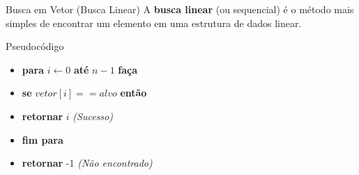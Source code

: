 \documentclass[9pt]{beamer}
\begin{document}
\begin{frame}{Busca em Vetor (Busca Linear)}
    A \textbf{busca linear} (ou sequencial) é o método mais simples de encontrar um elemento em uma estrutura de dados linear.
    \vspace{0.3cm}
    \begin{block}{Pseudocódigo}
        \begin{itemize}
            \item[] \textbf{para} $i \gets 0$ \textbf{até} $n-1$ \textbf{faça}
            \item[] \hspace{0.5cm} \textbf{se} $vetor[i] == alvo$ \textbf{então}
            \item[] \hspace{1.0cm} \textbf{retornar} $i$ \textit{(Sucesso)}
            \item[] \textbf{fim para}
            \item[] \textbf{retornar} -1 \textit{(Não encontrado)}
        \end{itemize}
    \end{block}
    \begin{center}
    \end{center}
\end{frame}
\end{document}
